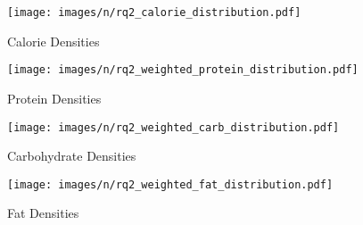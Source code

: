 \begin{figure*}[t]
    \centering
    \begin{subfigure}{0.25\textwidth}
        \centering
        \texttt{[image: images/n/rq2\_calorie\_distribution.pdf]}
        \caption{Calorie Densities}
        \label{fig:rq2_calorie}
    \end{subfigure}
    \hfill
    \begin{subfigure}{0.24\textwidth}
        \centering
        \texttt{[image: images/n/rq2\_weighted\_protein\_distribution.pdf]}
        \caption{Protein Densities}
        \label{fig:rq2_protein}
        \end{subfigure}
    \hfill
    \begin{subfigure}{0.24\textwidth}
        \centering
        \texttt{[image: images/n/rq2\_weighted\_carb\_distribution.pdf]}
        \caption{Carbohydrate Densities}
        \label{fig:rq2_carb}
        \end{subfigure}
    \hfill
    \begin{subfigure}{0.24\textwidth}
        \centering
        \texttt{[image: images/n/rq2\_weighted\_fat\_distribution.pdf]}
        \caption{Fat Densities}
        \label{fig:rq2_fat}
        \end{subfigure}


\end{figure*}

